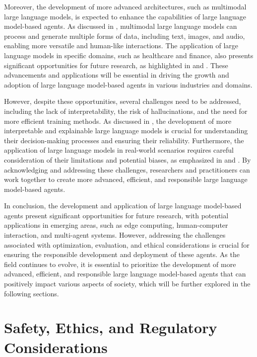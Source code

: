\documentclass[11pt,a4paper]{article}
\begin{document}
Moreover, the development of more advanced architectures, such as multimodal large language models, is expected to enhance the capabilities of large language model-based agents. As discussed in \cite{arxiv:2401.13601}, multimodal large language models can process and generate multiple forms of data, including text, images, and audio, enabling more versatile and human-like interactions. The application of large language models in specific domains, such as healthcare and finance, also presents significant opportunities for future research, as highlighted in \cite{arxiv:2408.06361} and \cite{doi:10.3348/kjr.2023.0997}. These advancements and applications will be essential in driving the growth and adoption of large language model-based agents in various industries and domains.

However, despite these opportunities, several challenges need to be addressed, including the lack of interpretability, the risk of hallucinations, and the need for more efficient training methods. As discussed in \cite{arxiv:2405.03207}, the development of more interpretable and explainable large language models is crucial for understanding their decision-making processes and ensuring their reliability. Furthermore, the application of large language models in real-world scenarios requires careful consideration of their limitations and potential biases, as emphasized in \cite{arxiv:2402.14744} and \cite{arxiv:2401.02777}. By acknowledging and addressing these challenges, researchers and practitioners can work together to create more advanced, efficient, and responsible large language model-based agents.

In conclusion, the development and application of large language model-based agents present significant opportunities for future research, with potential applications in emerging areas, such as edge computing, human-computer interaction, and multi-agent systems. However, addressing the challenges associated with optimization, evaluation, and ethical considerations is crucial for ensuring the responsible development and deployment of these agents. As the field continues to evolve, it is essential to prioritize the development of more advanced, efficient, and responsible large language model-based agents that can positively impact various aspects of society, which will be further explored in the following sections.


\section{Safety, Ethics, and Regulatory Considerations}
\end{document}
